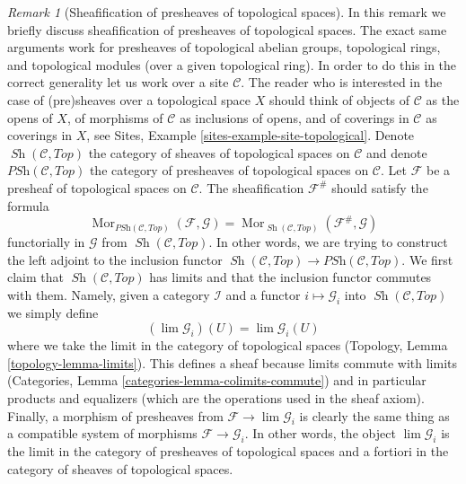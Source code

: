 \documentclass{stacks-project}
\newenvironment{reference}{\comment}{\endcomment}
\theoremstyle{plain}
\theoremstyle{definition}
\theoremstyle{remark}
\newtheorem{remark}[subsection]{Remark}
\numberwithin{equation}{subsection}
\def\lim{\mathop{\mathrm{lim}}\nolimits}
\def\Mor{\mathop{\mathrm{Mor}}\nolimits}
\def\Sh{\mathop{\mathit{Sh}}\nolimits}
\begin{document}
\begin{remark}[Sheafification of presheaves of topological spaces]
\label{remark-sheafification-of-presheaves-in-top}
\begin{reference}
\cite{Gray}
\end{reference}
In this remark we briefly discuss sheafification of presheaves
of topological spaces. The exact same arguments work for
presheaves of topological abelian groups, topological rings, and
topological modules (over a given topological ring). In order to
do this in the correct generality let us work over a site
$\mathcal{C}$. The reader who is interested in the case of (pre)sheaves
over a topological space $X$ should think of objects of $\mathcal{C}$
as the opens of $X$, of morphisms of $\mathcal{C}$ as inclusions of
opens, and of coverings in $\mathcal{C}$ as coverings in $X$, see
Sites, Example \ref{sites-example-site-topological}.
Denote $\Sh(\mathcal{C}, \textit{Top})$ the category of sheaves
of topological spaces on $\mathcal{C}$ and denote
$\textit{PSh}(\mathcal{C}, \textit{Top})$ the category of presheaves
of topological spaces on $\mathcal{C}$.
Let $\mathcal{F}$ be a presheaf of topological spaces on $\mathcal{C}$.
The sheafification $\mathcal{F}^\#$ should satisfy the formula
$$
\Mor_{\textit{PSh}(\mathcal{C}, \textit{Top})}(\mathcal{F}, \mathcal{G})
=
\Mor_{\Sh(\mathcal{C}, \textit{Top})}(\mathcal{F}^\#, \mathcal{G})
$$
functorially in $\mathcal{G}$ from $\Sh(\mathcal{C}, \textit{Top})$.
In other words, we are trying to construct the left adjoint
to the inclusion functor
$\Sh(\mathcal{C}, \textit{Top}) \to \textit{PSh}(\mathcal{C}, \textit{Top})$.
We first claim that $\Sh(\mathcal{C}, \textit{Top})$ has limits
and that the inclusion functor commutes with them.
Namely, given a category $\mathcal{I}$ and a functor
$i \mapsto \mathcal{G}_i$ into $\Sh(\mathcal{C}, \textit{Top})$
we simply define
$$
(\lim \mathcal{G}_i)(U) = \lim \mathcal{G}_i(U)
$$
where we take the limit in the category of topological spaces
(Topology, Lemma \ref{topology-lemma-limits}). This defines a sheaf
because limits commute with limits
(Categories, Lemma \ref{categories-lemma-colimits-commute})
and in particular products and equalizers (which are the
operations used in the sheaf axiom). Finally, a morphism
of presheaves from $\mathcal{F} \to \lim \mathcal{G}_i$ is
clearly the same thing as a compatible system of morphisms
$\mathcal{F} \to \mathcal{G}_i$. In other words, the object
$\lim \mathcal{G}_i$ is the limit in the category
of presheaves of topological spaces and a fortiori in the
category of sheaves of topological spaces.

\end{remark}
\end{document}
